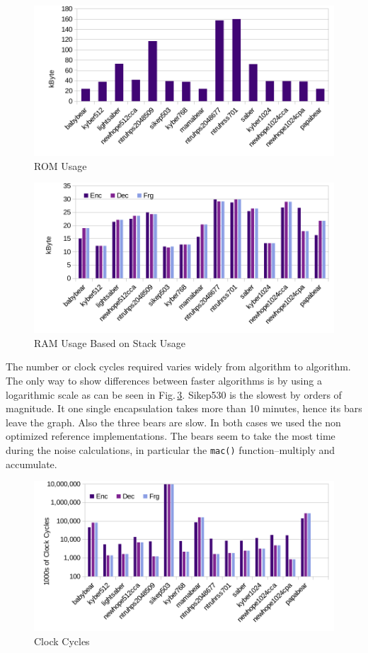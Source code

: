 \documentclass[10pt]{article}
\begin{document}
\begin{figure}[ht]
    \centering
    \includegraphics[scale=0.8]{./figures/rom.pdf}
    \caption{ROM Usage}
    \label{fig:rom}
\end{figure}


\begin{figure}[ht]
    \centering
    \includegraphics[scale=0.8]{./figures/ram.pdf}
    \caption{RAM Usage Based on Stack Usage}
    \label{fig:ram}
\end{figure}

The number or clock cycles required varies widely from algorithm to algorithm. The
only way to show differences between faster algorithms is by using a logarithmic scale
as can be seen in Fig.\,\ref{fig:clock}. Sikep530 is the slowest by orders of magnitude. It
one single encapsulation takes more than 10 minutes, hence its bars leave the graph.
Also the three bears are slow. In both cases we used the non optimized reference 
implementations. The bears seem to take the most time during the noise calculations,
in particular the \texttt{mac()} function--multiply and accumulate.

\begin{figure}[ht]
    \centering
    \includegraphics[scale=0.8]{./figures/clock.pdf}
    \caption{Clock Cycles}
    \label{fig:clock}
\end{figure}
\end{document}

